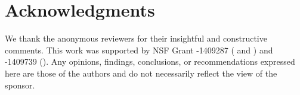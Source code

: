 \documentclass[sigconf]{acmart}
\newcommand{\latexfile}[1]{}
\begin{document}
\maketitle


\latexfile{10-introduction}
\latexfile{20-background}
\latexfile{30-method}
\latexfile{40-results}
\latexfile{50-discussion}
\latexfile{60-conclusion}

\section{Acknowledgments}
We thank the anonymous reviewers for their insightful and constructive
comments. This work was supported by NSF Grant -1409287 ( and ) and -1409739 ().
Any opinions, findings,
conclusions, or recommendations expressed here are those of the
authors and do not necessarily reflect the view of the sponsor.

\clearpage



\end{document}
